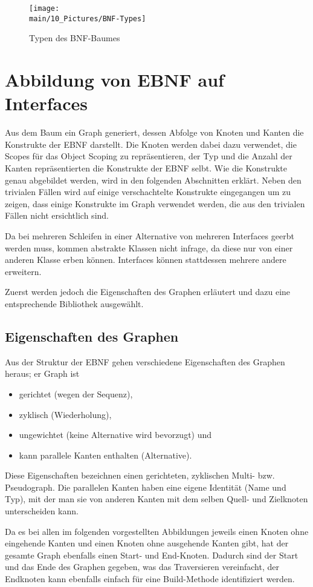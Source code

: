 \documentclass[../InterneDSLs.tex]{subfiles}
\begin{document}
\begin{figure}[ht]
\centering
\texttt{[image: \\main/10\_Pictures/BNF-Types]}
\caption{Typen des BNF-Baumes}
\label{FIG:TypesBNF}
\end{figure}

\section{Abbildung von EBNF auf Interfaces}\label{SEC:EBNFtoInterface}
Aus dem Baum ein Graph generiert, dessen Abfolge von Knoten und Kanten die Konstrukte der EBNF darstellt. Die Knoten werden dabei dazu verwendet, die Scopes für das Object Scoping zu repräsentieren, der Typ und die Anzahl der Kanten repräsentierten die Konstrukte der EBNF selbt. Wie die Konstrukte genau abgebildet werden, wird in den folgenden Abschnitten erklärt. Neben den trivialen Fällen wird auf einige verschachtelte Konstrukte eingegangen um zu zeigen, dass einige Konstrukte im Graph verwendet werden, die aus den trivialen Fällen nicht ersichtlich sind.

Da bei mehreren Schleifen in einer Alternative von mehreren Interfaces geerbt werden muss, kommen abstrakte Klassen nicht infrage, da diese nur von einer anderen Klasse erben können. Interfaces können stattdessen mehrere andere erweitern.

Zuerst werden jedoch die Eigenschaften des Graphen erläutert und dazu eine entsprechende Bibliothek ausgewählt.

\subsection{Eigenschaften des Graphen}
Aus der Struktur der EBNF gehen verschiedene Eigenschaften des Graphen heraus; er Graph ist
\begin{itemize}
	\item gerichtet (wegen der Sequenz),
	\item zyklisch (Wiederholung),
	\item ungewichtet (keine Alternative wird bevorzugt) und
	\item kann parallele Kanten enthalten (Alternative).
\end{itemize}
Diese Eigenschaften bezeichnen einen gerichteten, zyklischen Multi- bzw. Pseudograph. Die parallelen Kanten haben eine eigene Identität (Name und Typ), mit der man sie von anderen Kanten mit dem selben Quell- und Zielknoten unterscheiden kann.

Da es bei allen im folgenden vorgestellten Abbildungen jeweils einen Knoten ohne eingehende Kanten und einen Knoten ohne ausgehende Kanten gibt, hat der gesamte Graph ebenfalls einen Start- und End-Knoten. Dadurch sind der Start und das Ende des Graphen gegeben, was das Traversieren vereinfacht, der Endknoten kann ebenfalls einfach für eine Build-Methode identifiziert werden.
\end{document}
